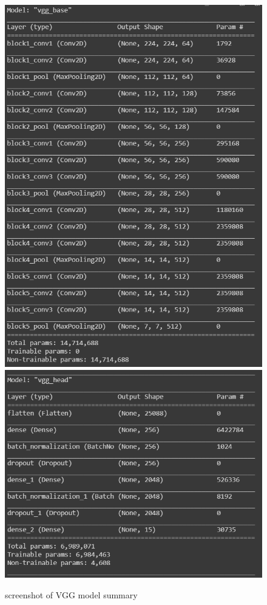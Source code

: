 \begin{figure}[htbp]
    \centering
    \includegraphics[scale=0.7]{vgg_1.png}
    \includegraphics[scale=0.7]{vgg_2.png}
    \caption{screenshot of VGG model summary}
    \label{fig:vgg_summary}
\end{figure}




